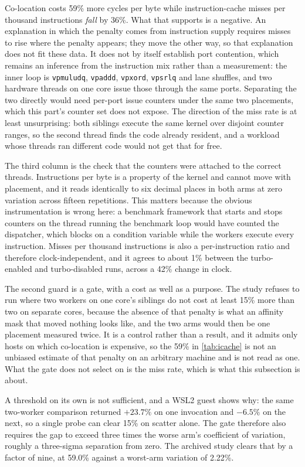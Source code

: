 \documentclass[acmsmall,screen,review]{acmart}
\theoremstyle{acmdefinition}
\newcommand{\code}[1]{\texttt{#1}}
\begin{document}
Co-location costs 59\% more cycles per byte while instruction-cache misses per
thousand instructions \emph{fall} by 36\%. What that supports is a negative.
An explanation in which the penalty comes from instruction supply requires
misses to rise where the penalty appears; they move the other way, so that
explanation does not fit these data. It does not by itself establish port
contention, which remains an inference from the instruction mix rather than a
measurement: the inner loop is \code{vpmuludq},
\code{vpaddd}, \code{vpxord}, \code{vpsrlq} and lane shuffles, and two hardware
threads on one core issue those through the same ports. Separating the two
directly would need per-port issue counters under the same two placements,
which this part's counter set does not expose. The direction of the miss rate
is at least unsurprising: both siblings execute the same kernel over
disjoint counter ranges, so the second thread finds the code already resident,
and a workload whose threads ran different code would not get that for free.

The third column is the check that the counters were attached to the correct
threads. Instructions per byte is a property of the kernel and cannot move with
placement, and it reads identically to six decimal places in both arms at zero
variation across fifteen repetitions. This matters because the obvious
instrumentation is wrong here: a benchmark framework that starts and stops
counters on the thread running the benchmark loop would have counted the
dispatcher, which blocks on a condition variable while the workers execute every
instruction. Misses per thousand instructions is also a per-instruction ratio
and therefore clock-independent, and it agrees to about 1\% between the
turbo-enabled and turbo-disabled runs, across a 42\% change in clock.

The second guard is a gate, with a cost as well as a purpose. The study refuses
to run where two workers on one core's siblings do not cost at least 15\% more
than two on separate cores, because the absence of that penalty is what an
affinity mask that moved nothing looks like, and the two arms would then be one
placement measured twice. It is a control rather than a result, and it admits
only hosts on which co-location is expensive, so the 59\% in \cref{tab:icache}
is not an unbiased estimate of that penalty on an arbitrary machine and is not
read as one. What the gate does not select on is the miss rate, which is what
this subsection is about.

A threshold on its own is not sufficient, and a WSL2 guest shows why: the same
two-worker comparison returned $+23.7\%$ on one invocation and $-6.5\%$ on the
next, so a single probe can clear 15\% on scatter alone. The gate therefore also
requires the gap to exceed three times the worse arm's coefficient of variation,
roughly a three-sigma separation from zero. The archived study clears that by a
factor of nine, at 59.0\% against a worst-arm variation of 2.22\%.
\end{document}
